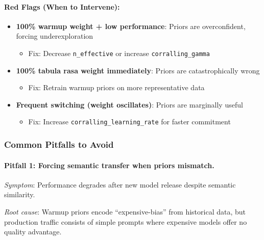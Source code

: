 \paragraph{Red Flags (When to Intervene):}
\begin{itemize}[leftmargin=*, itemsep=2pt]
    \item \textbf{100\% warmup weight + low performance}: Priors are overconfident, forcing underexploration
        \begin{itemize}
            \item Fix: Decrease \texttt{n\_effective} or increase \texttt{corralling\_gamma}
        \end{itemize}
    
    \item \textbf{100\% tabula rasa weight immediately}: Priors are catastrophically wrong
        \begin{itemize}
            \item Fix: Retrain warmup priors on more representative data
        \end{itemize}
    
    \item \textbf{Frequent switching (weight oscillates)}: Priors are marginally useful
        \begin{itemize}
            \item Fix: Increase \texttt{corralling\_learning\_rate} for faster commitment
        \end{itemize}
\end{itemize}


\subsubsection{Common Pitfalls to Avoid}

\paragraph{Pitfall 1: Forcing semantic transfer when priors mismatch.}
\textit{Symptom}: Performance degrades after new model release despite semantic similarity.

\textit{Root cause}: Warmup priors encode ``expensive-bias'' from historical data, but production traffic consists of simple prompts where expensive models offer no quality advantage.

